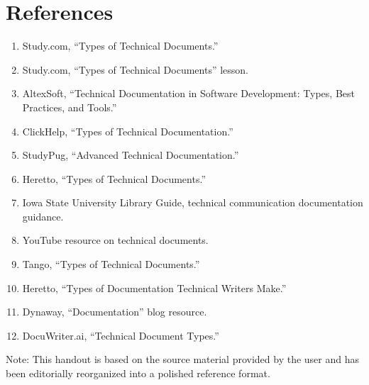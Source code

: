 \documentclass[11pt]{article}
\begin{document}
\section{References}
\begin{enumerate}[leftmargin=1.6em,itemsep=0.3em]
  \item Study.com, ``Types of Technical Documents.''
  \item Study.com, ``Types of Technical Documents'' lesson.
  \item AltexSoft, ``Technical Documentation in Software Development: Types, Best Practices, and Tools.''
  \item ClickHelp, ``Types of Technical Documentation.''
  \item StudyPug, ``Advanced Technical Documentation.''
  \item Heretto, ``Types of Technical Documents.''
  \item Iowa State University Library Guide, technical communication documentation guidance.
  \item YouTube resource on technical documents.
  \item Tango, ``Types of Technical Documents.''
  \item Heretto, ``Types of Documentation Technical Writers Make.''
  \item Dynaway, ``Documentation'' blog resource.
  \item DocuWriter.ai, ``Technical Document Types.''
\end{enumerate}

\vfill
{\footnotesize Note: This handout is based on the source material provided by the user and has been editorially reorganized into a polished reference format.}
\end{document}
